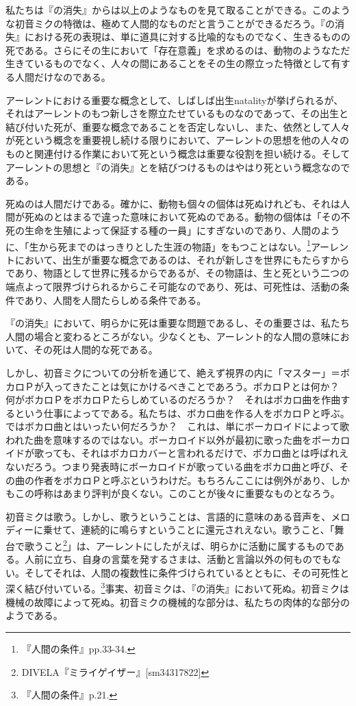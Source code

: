 \documentclass[b5j,twoside,twocolumn]{utarticle}
\begin{document}
私たちは『の消失』からは以上のようなものを見て取ることができる。このような初音ミクの特徴は、極めて人間的なものだと言うことができるだろう。『の消失』における死の表現は、単に道具に対する比喩的なものでなく、生きるものの死である。さらにその生において「存在意義」を求めるのは、動物のようなただ生きているものでなく、人々の間にあることをその生の際立った特徴として有する人間だけなのである。


アーレントにおける重要な概念として、しばしば出生natalityが挙げられるが、それはアーレントのもつ新しさを際立たせているものなのであって、その出生と結び付いた死が、重要な概念であることを否定しないし、また、依然として人々が死という概念を重要視し続ける限りにおいて、アーレントの思想を他の人々のものと関連付ける作業において死という概念は重要な役割を担い続ける。そしてアーレントの思想と『の消失』とを結びつけるものはやはり死という概念なのである。


死ぬのは人間だけである。確かに、動物も個々の個体は死ぬけれども、それは人間が死ぬのとはまるで違った意味において死ぬのである。動物の個体は「その不死の生命を生殖によって保証する種の一員」にすぎないのであり、人間のように、「生から死までのはっきりとした生涯の物語」をもつことはない。\footnote{『人間の条件』pp.33-34.}アーレントにおいて、出生が重要な概念であるのは、それが新しさを世界にもたらすからであり、物語として世界に残るからであるが、その物語は、生と死という二つの端点よって限界づけられるからこそ可能なのであり、死は、可死性は、活動の条件であり、人間を人間たらしめる条件である。


『の消失』において、明らかに死は重要な問題であるし、その重要さは、私たち人間の場合と変わるところがない。少なくとも、アーレント的な人間の意味において、その死は人間的な死である。


しかし、初音ミクについての分析を通じて、絶えず視界の内に「マスター」＝ボカロＰが入ってきたことは気にかけるべきことであろう。ボカロＰとは何か？　何がボカロＰをボカロＰたらしめているのだろうか？　それはボカロ曲を作曲するという仕事によってである。私たちは、ボカロ曲を作る人をボカロＰと呼ぶ。ではボカロ曲とはいったい何だろうか？　これは、単にボーカロイドによって歌われた曲を意味するのではない。ボーカロイド以外が最初に歌った曲をボーカロイドが歌っても、それはボカロカバーと言われるだけで、ボカロ曲とは呼ばれえないだろう。つまり発表時にボーカロイドが歌っている曲をボカロ曲と呼び、その曲の作者をボカロＰと呼ぶというわけだ。もちろんここには例外があり、しかもこの呼称はあまり評判が良くない。このことが後々に重要なものとなろう。


初音ミクは歌う。しかし、歌うということは、言語的に意味のある音声を、メロディーに乗せて、連続的に鳴らすということに還元されえない。歌うこと、「舞台で歌うこと\footnote{DIVELA『ミライゲイザー』[sm34317822]}」は、アーレントにしたがえば、明らかに活動に属するものである。人前に立ち、自身の言葉を発するさまは、活動と言論以外の何ものでもない。そしてそれは、人間の複数性に条件づけられているとともに、その可死性と深く結び付いている。\footnote{『人間の条件』p.21.}事実、初音ミクは、『の消失』において死ぬ。初音ミクは機械の故障によって死ぬ。初音ミクの機械的な部分は、私たちの肉体的な部分のようである。
\end{document}
